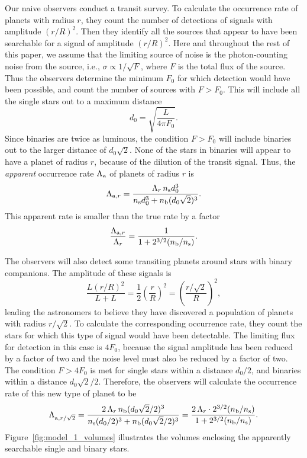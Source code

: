 \documentclass[12pt,modern,trackchanges]{aastex61}
\renewcommand{\a}{_{\rm a}}
\newcommand{\s}{_{\rm s}}
\renewcommand{\b}{_{\rm b}}
\begin{document}
Our naive observers conduct a transit survey. To calculate the
occurrence rate of planets with radius $r$, they count the number of
detections of signals with amplitude $(r/R)^2$.  Then they identify
all the sources that appear to have been searchable for a signal of
amplitude $(r/R)^2$.  Here and throughout the rest of this paper, we
assume that the limiting source of noise is the photon-counting noise
from the source, i.e., $\sigma \propto 1/\sqrt{F}$, where $F$ is the
total flux of the source.  Thus the observers determine the minimum
$F_0$ for which detection would have been possible, and count the
number of sources with $F>F_0$. This will include all the single stars
out to a maximum distance
\begin{equation}
  d_0 = \sqrt{\frac{L}{4\pi F_0}}.
  \label{eq:dmax}
\end{equation}
Since binaries are twice as luminous, the condition $F>F_0$ will
include binaries out to the larger distance of $d_0\sqrt{2}$.  None of
the stars in binaries will appear to have a planet of radius $r$,
because of the dilution of the transit signal.  Thus, the {\it
apparent} occurrence rate $\Lambda\a$ of planets of radius $r$ is
\begin{equation}
    \Lambda_{{\rm{a}},r} = 
        \frac{\Lambda_r \, n\s d_0^3}
        {n\s d_0^3 + n\b (d_0\sqrt{2})^3}.
    \label{eq:rate_at_rp}
\end{equation}
This apparent rate is smaller than the true rate by a factor
\begin{equation}
    \frac{\Lambda_{{\rm{a}},r}}{\Lambda_r} = 
        \frac{1}{1 + 2^{3/2}(n\b/n\s)}.
    \label{eq:correction_rp}
\end{equation}

The observers will also detect some transiting planets around stars
with binary companions.  The amplitude of these signals is
\begin{equation}
  \frac{L(r/R)^2}{L + L} = \frac{1}{2}\left(\frac{r}{R}\right)^2 =
  \left(\frac{r/\sqrt{2}}{R}\right)^2,
    \label{eq:delta_obs_general} 
\end{equation}
leading the astronomers to believe they have discovered a population
of planets with radius $r/\sqrt{2}$.  To calculate the corresponding
occurrence rate, they count the stars for which this type of signal
would have been detectable.  The limiting flux for detection in this
case is $4F_0$, because the signal amplitude has been reduced by a
factor of two and the noise level must also be reduced by a factor of
two.  The condition $F>4F_0$ is met for single stars within a distance
$d_0/2$, and binaries within a distance $d_0\sqrt{2}/2$.  Therefore,
the observers will calculate the occurrence rate of this new type of
planet to be
\begin{equation}
    \Lambda_{{\rm{a}},r/\sqrt{2}} = 
        \frac{2\, \Lambda_r \, n\b (d_0\sqrt{2}/2)^3}
        {n\s (d_0/2)^3 + n\b (d_0\sqrt{2}/2)^3}
    =
    \frac{2\, \Lambda_r \cdot2^{3/2}(n\b/n\s)}{1 + 2^{3/2} (n\b/n\s)}.
    \label{eq:correction_diluted_rp}
\end{equation}
Figure~\ref{fig:model_1_volumes} illustrates the
volumes enclosing the apparently searchable single and binary stars.
\end{document}
